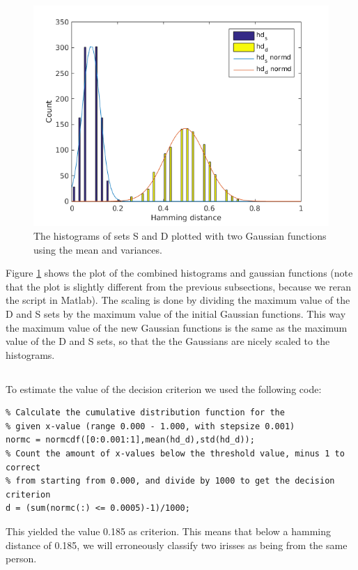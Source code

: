 \documentclass{article}
\begin{document}
\begin{figure}[H]
	\centering
	\includegraphics[width=.7\linewidth]{2_6.png}
	\caption{The histograms of sets S and D plotted with two Gaussian functions using the mean and variances.}
	\label{fig2.6}
\end{figure}
Figure \ref{fig2.6} shows the plot of the combined histograms and gaussian functions (note that the plot is slightly different from the previous subsections, because we reran the script in Matlab). The scaling is done by dividing the maximum value of the D and S sets by the maximum value of the initial Gaussian functions. This way the maximum value of the new Gaussian functions is the same as the maximum value of the D and S sets, so that the the Gaussians are nicely scaled to the histograms.

\subsection{}
\subsubsection{}
To estimate the value of the decision criterion we used the following code:
\begin{lstlisting}
% Calculate the cumulative distribution function for the 
% given x-value (range 0.000 - 1.000, with stepsize 0.001)
normc = normcdf([0:0.001:1],mean(hd_d),std(hd_d));
% Count the amount of x-values below the threshold value, minus 1 to correct 
% from starting from 0.000, and divide by 1000 to get the decision criterion
d = (sum(normc(:) <= 0.0005)-1)/1000;
\end{lstlisting}
This yielded the value 0.185 as criterion. This means that below a hamming distance of 0.185, we will erroneously classify two irisses as being from the same person.
\end{document}
